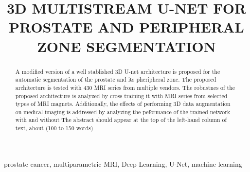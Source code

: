 \documentclass{article}
\title{3D MULTISTREAM U-NET FOR PROSTATE AND PERIPHERAL ZONE SEGMENTATION}
\begin{document}
\maketitle

\begin{abstract}
A modified version of a well stablished 3D U-net architecture is proposed
for the automatic segmentation of the prostate and its pheripheral zone. The
proposed architecture is tested with 430 MRI series from multiple vendors. 
The robustnes of the proposed architecture is analyzed by cross training
it with MRI series from selected types of MRI magnets. Additionally, the 
effects of performing 3D data augmentation on medical imaging is addressed
by analyzing the peformance of the trained network with and without 
The abstract should appear at the top of the left-hand column of text, about
(100 to 150 words)
\end{abstract}

\begin{keywords}
prostate cancer, multiparametric MRI, Deep Learning, U-Net, machine learning
\end{keywords}








\end{document}
